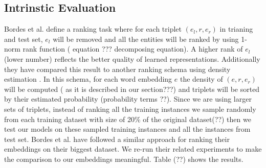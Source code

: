 \documentclass[11pt]{article}
\begin{document}
\subsection{Intrinstic Evaluation}
\label{ssec:intrinsic}

Bordes et al. define a ranking task where for each triplet $(e_{l} , r, e_{r} ) $ in trianing and test set,
     $e_{l}$ will be removed and all the entities will be ranked by 
     using 1-norm rank function  ( equation ??? decomposing equation). A higher rank of $e_{l}$ (lower number)
     reflects the better quality of learned representations. Additionally they have compared this result to
     another ranking schema using density estimation . 
     In this schema, for each word embedding $e$ the density of $(e , r, e_{r} )$ will be computed
     ( as it is described in our section???) and triplets will be sorted by their estimated probability 
     (probability terms ??). Since we are using larger sets of triplets, instead of ranking
     all the training instances
     we sample randomly from each training dataset with size of 20\% of the original dataset(??) then
     we test our models on these sampled training instances and all the instances from test set. Bordes et al. have followed
     a similar  approach for ranking their embeddings on their biggest dataset. We re-run  their related experiments to make 
     the comparison to our embeddings meaningful. Table (??) shows the results.
\end{document}
